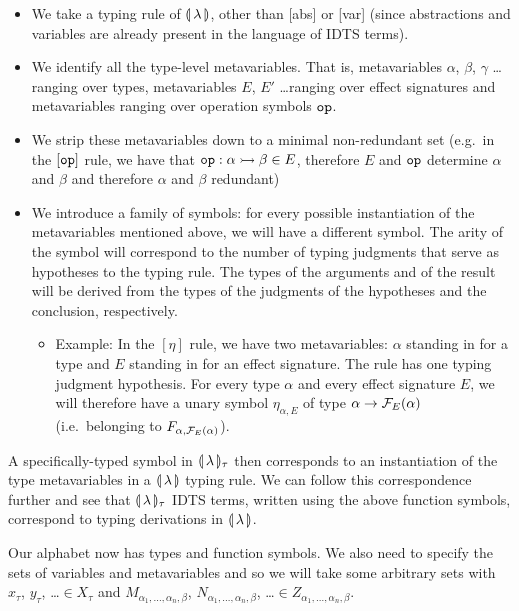 \begin{itemize}
\item We take a typing rule of $\llparenthesis \, \lambda \, \rrparenthesis$, other than [abs] or
  [var] (since abstractions and variables are already present in the
  language of IDTS terms).
\item We identify all the type-level metavariables. That is, metavariables
  $\alpha$, $\beta$, $\gamma$ \ldots ranging over types, metavariables $E$,
  $E'$ \ldots ranging over effect signatures and metavariables ranging over
  operation symbols $\mathtt{op}$.
\item We strip these metavariables down to a minimal non-redundant set
  (e.g.\ in the $[\mathtt{op}]$ rule, we have that
  $\mathtt{op} : \alpha \rightarrowtail \beta \in E$, therefore $E$ and $\mathtt{op}$
  determine $\alpha$ and $\beta$ and therefore $\alpha$ and $\beta$
  redundant)
\item We introduce a family of symbols: for every possible instantiation of
  the metavariables mentioned above, we will have a different symbol. The
  arity of the symbol will correspond to the number of typing judgments
  that serve as hypotheses to the typing rule. The types of the arguments
  and of the result will be derived from the types of the judgments of the
  hypotheses and the conclusion, respectively.
  \begin{itemize}
  \item Example: In the $[\eta]$ rule, we have two metavariables: $\alpha$
    standing in for a type and $E$ standing in for an effect signature. The
    rule has one typing judgment hypothesis. For every type $\alpha$ and
    every effect signature $E$, we will therefore have a unary symbol
    $\eta_{\alpha, E}$ of type $\alpha \to \mathcal{F}_E(\alpha)$ (i.e.\ belonging
    to $F_{\alpha, \mathcal{F}_E(\alpha)}$).
  \end{itemize}
\end{itemize}

A specifically-typed symbol in
$\llparenthesis \, \lambda \, \rrparenthesis_\tau$ then corresponds to an instantiation of the type
metavariables in a
$\llparenthesis \, \lambda \, \rrparenthesis$ typing rule. We can follow this correspondence further
and see that
$\llparenthesis \, \lambda \, \rrparenthesis_\tau$ IDTS terms, written using the above function
symbols, correspond to typing derivations in $\llparenthesis \, \lambda \, \rrparenthesis$.

Our alphabet now has types and function symbols. We also need to specify
the sets of variables and metavariables and so we will take some arbitrary
sets with $x_\tau$, $y_\tau$, \ldots $\in X_\tau$ and
$M_{\alpha_1,\ldots,\alpha_n,\beta}$, $N_{\alpha_1,\ldots,\alpha_n,\beta}$,
\ldots $\in Z_{\alpha_1,\ldots,\alpha_n,\beta}$.

